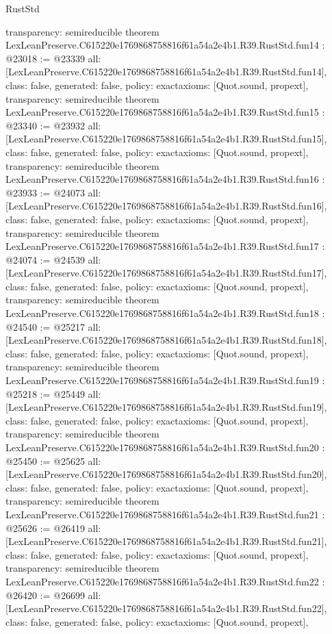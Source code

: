 \begin{lexlean}{RustStd}
\begin{coremodule}
{  transparency: semireducible
}
theorem LexLeanPreserve.C615220e1769868758816f61a54a2e4b1.R39.RustStd.fun14 : @23018 := @23339 {
  all: [LexLeanPreserve.C615220e1769868758816f61a54a2e4b1.R39.RustStd.fun14],
  class: false,
  generated: false,
  policy: exact{axioms: [Quot.sound, propext]},
  transparency: semireducible
}
theorem LexLeanPreserve.C615220e1769868758816f61a54a2e4b1.R39.RustStd.fun15 : @23340 := @23932 {
  all: [LexLeanPreserve.C615220e1769868758816f61a54a2e4b1.R39.RustStd.fun15],
  class: false,
  generated: false,
  policy: exact{axioms: [Quot.sound, propext]},
  transparency: semireducible
}
theorem LexLeanPreserve.C615220e1769868758816f61a54a2e4b1.R39.RustStd.fun16 : @23933 := @24073 {
  all: [LexLeanPreserve.C615220e1769868758816f61a54a2e4b1.R39.RustStd.fun16],
  class: false,
  generated: false,
  policy: exact{axioms: [Quot.sound, propext]},
  transparency: semireducible
}
theorem LexLeanPreserve.C615220e1769868758816f61a54a2e4b1.R39.RustStd.fun17 : @24074 := @24539 {
  all: [LexLeanPreserve.C615220e1769868758816f61a54a2e4b1.R39.RustStd.fun17],
  class: false,
  generated: false,
  policy: exact{axioms: [Quot.sound, propext]},
  transparency: semireducible
}
theorem LexLeanPreserve.C615220e1769868758816f61a54a2e4b1.R39.RustStd.fun18 : @24540 := @25217 {
  all: [LexLeanPreserve.C615220e1769868758816f61a54a2e4b1.R39.RustStd.fun18],
  class: false,
  generated: false,
  policy: exact{axioms: [Quot.sound, propext]},
  transparency: semireducible
}
theorem LexLeanPreserve.C615220e1769868758816f61a54a2e4b1.R39.RustStd.fun19 : @25218 := @25449 {
  all: [LexLeanPreserve.C615220e1769868758816f61a54a2e4b1.R39.RustStd.fun19],
  class: false,
  generated: false,
  policy: exact{axioms: [Quot.sound, propext]},
  transparency: semireducible
}
theorem LexLeanPreserve.C615220e1769868758816f61a54a2e4b1.R39.RustStd.fun20 : @25450 := @25625 {
  all: [LexLeanPreserve.C615220e1769868758816f61a54a2e4b1.R39.RustStd.fun20],
  class: false,
  generated: false,
  policy: exact{axioms: [Quot.sound, propext]},
  transparency: semireducible
}
theorem LexLeanPreserve.C615220e1769868758816f61a54a2e4b1.R39.RustStd.fun21 : @25626 := @26419 {
  all: [LexLeanPreserve.C615220e1769868758816f61a54a2e4b1.R39.RustStd.fun21],
  class: false,
  generated: false,
  policy: exact{axioms: [Quot.sound, propext]},
  transparency: semireducible
}
theorem LexLeanPreserve.C615220e1769868758816f61a54a2e4b1.R39.RustStd.fun22 : @26420 := @26699 {
  all: [LexLeanPreserve.C615220e1769868758816f61a54a2e4b1.R39.RustStd.fun22],
  class: false,
  generated: false,
  policy: exact{axioms: [Quot.sound, propext]},
}
\end{coremodule}
\end{lexlean}
